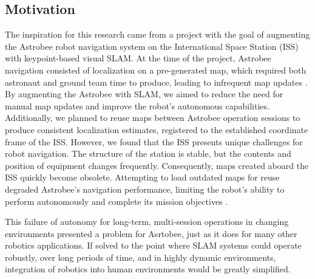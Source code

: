 \subsection{Motivation}


The inspiration for this research came from a project with the goal of augmenting the Astrobee robot navigation system on the International Space Station (ISS) with keypoint-based visual SLAM. At the time of the project, Astrobee navigation consisted of localization on a pre-generated map, which required both astronaut and ground team time to produce, leading to infrequent map updates \cite{soussanAstroLocEfficientRobust2022}. By augmenting the Astrobee with SLAM, we aimed to reduce the need for manual map updates and improve the robot's autonomous capabilities. Additionally, we planned to reuse maps between Astrobee operation sessions to produce consistent localization estimates, registered to the established coordinate frame of the ISS. However, we found that the ISS presents unique challenges for robot navigation. The structure of the station is stable, but the contents and position of equipment changes frequently. Consequently, maps created aboard the ISS quickly become obsolete. Attempting to load outdated maps for reuse degraded Astrobee's navigation performance, limiting the robot's ability to perform autonomously and complete its mission objectives \cite{zuralesCollaborativeSensingMapping2024}.


This failure of autonomy for long-term, multi-session operations in changing environments presented a problem for Asrtobee, just as it does for many other robotics applications. If solved to the point where SLAM systems could operate robustly, over long periods of time, and in highly dynamic environments, integration of robotics into human environments would be greatly simplified.